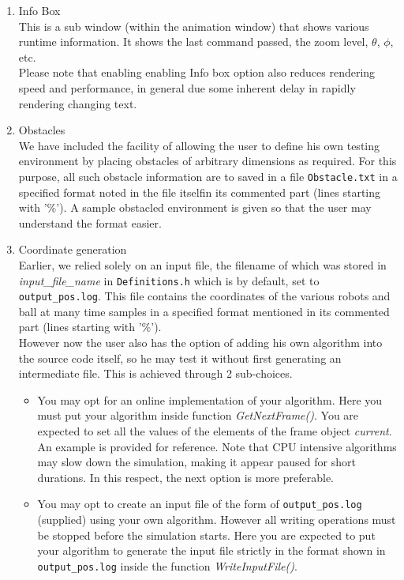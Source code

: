 \documentclass[10pt,a4paper]{article}
\begin{document}
\begin{enumerate}
\item Info Box \\
This is a sub window (within the animation window) that shows various runtime information. It shows the last command passed, the zoom level, $\theta$, $\phi$, etc. \\
Please note that enabling enabling Info box option also reduces rendering speed and performance, in general due some inherent delay in rapidly rendering changing text.

\item Obstacles \\
We have included the facility of allowing the user to define his own testing environment by placing obstacles of arbitrary dimensions as required. For this purpose, all such obstacle information are to saved in a file {\tt Obstacle.txt} in a specified format noted in the file itselfin its commented part (lines starting with '\%'). A sample obstacled environment is given so that the user may understand the format easier.

\item Coordinate generation \\
Earlier, we relied solely on an input file, the filename of which was stored in {\it input\_file\_name} in {\tt Definitions.h} which is by default, set to {\tt output\_pos.log}. This file contains the coordinates of the various robots and ball at many time samples in a specified format mentioned in its commented part (lines starting with '\%'). \\
However now the user also has the option of adding his own algorithm into the source code itself, so he may test it without first generating an intermediate file. This is achieved through 2 sub-choices.
	\begin{itemize}
	\item You may opt for an online implementation of your algorithm. Here you must put your algorithm inside function {\it GetNextFrame()}. You are expected to set all the values of the elements of the frame object {\it current}. An example is provided for reference. Note that CPU intensive algorithms may slow down the simulation, making it appear paused for short durations. In this respect, the next option is more preferable.
	\item You may opt to create an input file of the form of {\tt output\_pos.log} (supplied) using your own algorithm. However all writing operations must be stopped before the simulation starts. Here you are expected to put your algorithm to generate the input file strictly in the format shown in {\tt output\_pos.log} inside the function {\it WriteInputFile()}.
	\end{itemize}


\end{enumerate}
\end{document}

